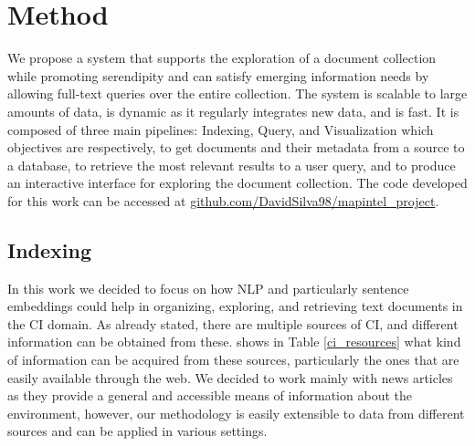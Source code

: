 \documentclass[a4paper]{article}
\begin{document}
\section*{Method}
We propose a system that supports the exploration of a document collection while promoting serendipity and can satisfy emerging information needs by allowing full-text queries over the entire collection.
The system is scalable to large amounts of data, is dynamic as it regularly integrates new data, and is fast. It is composed of three main pipelines: Indexing, Query, and Visualization which objectives are respectively, to get documents and their metadata from a source to a database, to retrieve the most relevant results to a user query, and to produce an interactive interface for exploring the document collection. The code developed for this work can be accessed at \href{https://github.com/DavidSilva98/mapintel_project}{github.com/DavidSilva98/mapintel\_project}.

\subsection*{Indexing}
In this work we decided to focus on how NLP and particularly sentence embeddings could help in organizing, exploring, and retrieving text documents in the CI domain. As already stated, there are multiple sources of CI, and different information can be obtained from these. \citet{dey2011} shows in Table \ref{ci_resources} what kind of information can be acquired from these sources, particularly the ones that are easily available through the web. We decided to work mainly with news articles as they provide a general and accessible means of information about the environment, however, our methodology is easily extensible to data from different sources and can be applied in various settings. 
\end{document}
